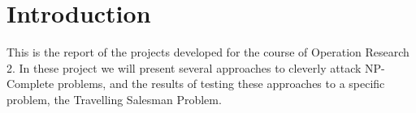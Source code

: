 \chapter{Introduction}
This is the report of the projects developed for the course of Operation Research 2. In these project we will present several approaches to cleverly attack NP-Complete problems, and the results of testing these approaches to a specific problem, the Travelling Salesman Problem.
